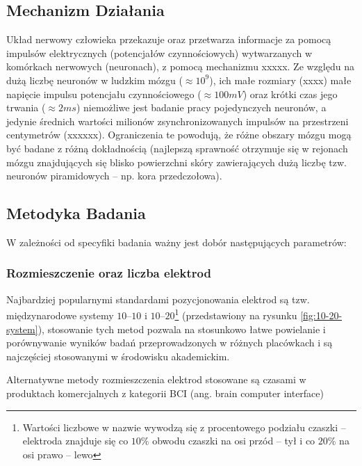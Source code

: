 \documentclass{./assets/wfis}
\begin{document}
\subsection{Mechanizm Działania}
Układ nerwowy człowieka przekazuje oraz przetwarza informacje za pomocą impulsów elektrycznych (potencjałów czynnościowych) wytwarzanych w komórkach nerwowych (neuronach), z pomocą mechanizmu xxxxx. Ze względu na dużą liczbę neuronów w ludzkim mózgu ($\approx10^9$\cite{herculano-houzel_human_2009}), ich małe rozmiary (xxxx) małe napięcie impulsu potencjału czynnościowego ($\approx100mV$\cite{biga_anatomy_2019}) oraz krótki czas jego trwania ($\approx2ms$\cite{biga_anatomy_2019}) niemożliwe jest badanie pracy pojedynczych neuronów, a jedynie średnich wartości milionów zsynchronizowanych impulsów na przestrzeni centymetrów (xxxxxx). Ograniczenia te powodują, że różne obszary mózgu mogą być badane z różną dokładnością (najlepszą sprawność otrzymuje się w rejonach mózgu znajdujących się blisko powierzchni skóry zawierających dużą liczbę tzw. neuronów piramidowych \cite{}– np. kora przedczołowa\cite{}).

\subsection{Metodyka Badania}
W zależności od specyfiki badania ważny jest dobór następujących parametrów:

\subsubsection{Rozmieszczenie oraz liczba elektrod}
Najbardziej popularnymi standardami pozycjonowania elektrod są tzw. międzynarodowe systemy $10$–$10$ i $10$–$20$\footnote{Wartości liczbowe w nazwie wywodzą się  z procentowego podziału czaszki – elektroda znajduje się co $10\%$ obwodu czaszki na osi przód – tył i co $20\%$ na osi prawo – lewo} \cite{herbert_h_jasper_report_1958} (przedstawiony na rysunku \ref{fig:10-20-system}), stosowanie tych metod pozwala na stosunkowo łatwe powielanie i porównywanie wyników badań przeprowadzonych w różnych placówkach i są najczęściej stosowanymi w środowisku akademickim. 

Alternatywne metody rozmieszczenia elektrod stosowane są czasami w produktach komercjalnych z kategorii BCI (ang. brain computer interface) 
\end{document}
